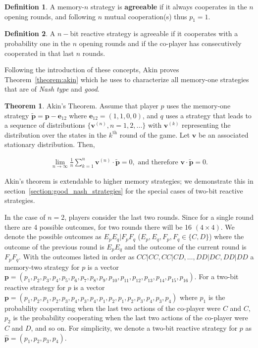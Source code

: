 \documentclass{article}
\theoremstyle{definition}
\newtheorem{definition}{Definition}[section]
\newtheorem{theorem}{Theorem}[section]
\begin{document}
\begin{definition}\label{definition:memn_agreeable}
  A memory-\(n\) strategy is \textbf{agreeable} if it always cooperates in the
  \(n\) opening rounds, and following \(n\) mutual cooperation(s) thus
  \(p_1=1\).
\end{definition}

\begin{definition}\label{definition:nbit_agreeable} A \(n-\)bit reactive strategy is
agreeable if it cooperates with a probability one in the \(n\) opening rounds
and if the co-player has consecutively cooperated in that last \(n\) rounds.
\end{definition}

Following the introduction of these concepts, Akin proves
Theorem~\ref{theorem:akin} which he uses to characterize all memory-one
strategies that are of \textit{Nash type} and \textit{good}.

\begin{theorem}{Akin's Theorem.}
  Assume that player \(p\) uses the memory-one strategy \(\mathbf{\tilde{p}} = \mathbf{p} - \mathbf{e}_{12}\) where
  \(\mathbf{e}_{12} = (1, 1, 0, 0)\), and \(q\) uses a strategy that leads to a sequence
  of distributions \(\{\mathbf{v}^{(n)}, n = 1, 2, ...\}\) with \(\mathbf{v}^{(k)}\) representing the
  distribution over the states in the \(k^{\text{th}}\) round of the game. Let
  \(\mathbf{v}\) be an associated stationary distribution. Then,

  \begin{align}
    \lim_{n \rightarrow \infty} \frac{1}{n} \sum_{k=1}^{n} \mathbf{v}^{(n)} \cdot \mathbf{\tilde{p}} = 0, \text{ and therefore } \mathbf{v} \cdot \mathbf{\tilde{p}} = 0.
  \end{align}
\end{theorem}\label{theorem:akin}

Akin's theorem is extendable to higher memory strategies; we demonstrate this in section~\ref{section:good_nash_strategies}
for the special cases of two-bit reactive strategies.

In the case of \(n=2\), players consider the last two rounds. Since for a single
round there are 4 possible outcomes, for two rounds there will be 16 \((4 \times
4)\). We denote the possible outcomes as \(E_p E_q | F_p F_q\) (\(E_p, E_q, F_p,
F_q \in \{C, D\}\)) where the outcome of the previous round is \(E_p E_q\) and
the outcome of the current round is \(F_p F_q\). With the outcomes listed in
order as \(CC|CC, CC|CD, \dots, DD|DC, DD|DD\) a memory-two strategy for \(p\) is a
vector \(\mathbf{p} = (p_1, p_2, p_3, p_4, p_5, p_6, p_7, p_8, p_9, p_{10},
p_{11}, p_{12}, p_{13}, p_{14}, \allowbreak p_{15}, p_{16})\). For a two-bit
reactive strategy for \(p\) is a vector \(\mathbf{p} = (p_1, p_2, p_1, p_2, p_3,
p_4, p_3, p_4, p_1, p_2, p_1, p_2, p_3, p_4, \allowbreak p_3, p_4)\) where
\(p_1\) is the probability cooperating when the last two actions of the
co-player were \(C\) and \(C\), \(p_2\) is the probability cooperating when the
last two actions of the co-player were \(C\) and \(D\), and so on. For
simplicity, we denote a two-bit reactive strategy for \(p\) as
\(\mathbf{\hat{p}} = (p_1, p_2, p_3, p_4)\).
\end{document}
